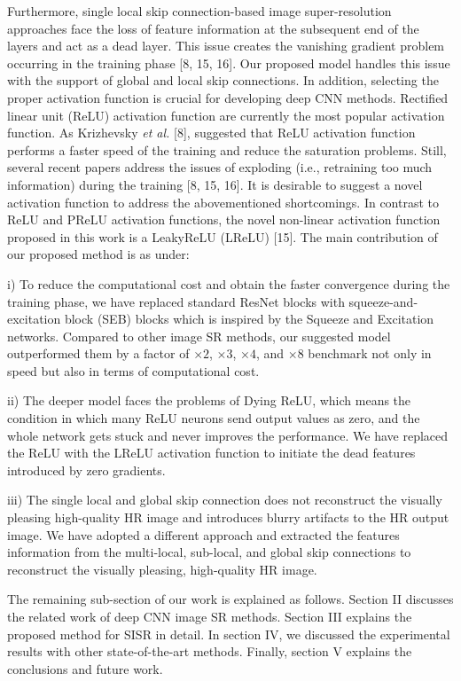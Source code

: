 \documentclass{ieeeaccess}
\begin{document}
Furthermore, single local skip connection-based image super-resolution approaches face the loss of feature information at the subsequent end of the layers and act as a dead layer. This issue creates the vanishing gradient problem occurring in the training phase [8, 15, 16]. Our proposed model handles this issue with the support of global and local skip connections. In addition, selecting the proper activation function is crucial for developing deep CNN methods. Rectified linear unit (ReLU) activation function are currently the most popular activation function. As Krizhevsky \textit{et al.} [8], suggested that ReLU activation function performs a faster speed of the training and reduce the saturation problems. Still, several recent papers address the issues of exploding (i.e., retraining too much information) during the training [8, 15, 16]. It is desirable to suggest a novel activation function to address the abovementioned shortcomings. In contrast to ReLU and PReLU activation functions, the novel non-linear activation function proposed in this work is a LeakyReLU (LReLU) [15].
The main contribution of our proposed method is as under:

i) To reduce the computational cost and obtain the faster convergence during the training phase, we have replaced standard ResNet blocks with squeeze-and-excitation block (SEB) blocks which is inspired by the Squeeze and Excitation networks. Compared to other image SR methods, our suggested model outperformed them by a factor of $\times2$, $\times3$, $\times4$, and $\times8$ benchmark not only in speed but also in terms of computational cost.


ii) The deeper model faces the problems of Dying ReLU, which means the condition in which many ReLU neurons send output values as zero, and the whole network gets stuck and never improves the performance. We have replaced the ReLU with the LReLU activation function to initiate the dead features introduced by zero gradients.

iii) The single local and global skip connection does not reconstruct the visually pleasing high-quality HR image and introduces blurry artifacts to the HR output image. We have adopted a different approach and extracted the features information from the multi-local, sub-local, and global skip connections to reconstruct the visually pleasing, high-quality HR image.

The remaining sub-section of our work is explained as follows. Section II discusses the related work of deep CNN image SR methods. Section III explains the proposed method for SISR in detail. In section IV, we discussed the experimental  results with other state-of-the-art methods. Finally, section V explains the conclusions  and future work.
\end{document}
